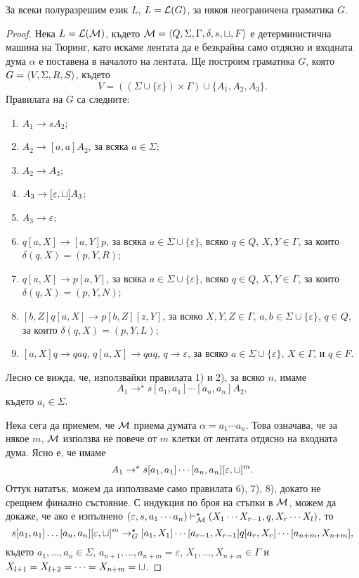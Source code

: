 \begin{lemma}
  За всеки полуразрешим език $L$, $L = \mathcal{L}(G)$, за някоя неограничена граматика $G$.  
\end{lemma}
\begin{proof}
  Нека $L = \mathcal{L}(\mathcal{M})$, където $\mathcal{M} = \langle{Q,\Sigma,\Gamma,\delta,s,\sqcup,F}\rangle$ е детерминистична машина на Тюринг,
  като искаме лентата да е безкрайна само отдясно и входната дума $\alpha$ е
  поставена в началото на лентата.
  Ще построим граматика $G$, която 
  $G = \langle{V,\Sigma,R,S}\rangle$, където 
  \[V = ((\Sigma\cup\{\varepsilon\})\times\Gamma) \cup \{A_1,A_2,A_3\}.\]
  Правилата на $G$ са следните:
  \begin{enumerate}[1)]
  \item 
    $A_1 \to sA_2$;
  \item
    $A_2 \to [a,a]A_2$, за всяка $a\in\Sigma$;
  \item
    $A_2 \to A_3$;
  \item
    $A_3 \to [\varepsilon,\sqcup]A_3$;
  \item
    $A_3 \to \varepsilon$;
  \item
    $q[a,X] \to [a,Y]p$, за всяка $a \in \Sigma\cup\{\varepsilon\}$, всяко $q\in Q$, $X,Y \in\Gamma$, 
    за които $\delta(q,X) = (p,Y,R)$;
  \item
    $q[a,X] \to p[a,Y]$, за всяка $a \in \Sigma\cup\{\varepsilon\}$, всяко $q\in Q$, $X,Y \in\Gamma$, 
    за които $\delta(q,X) = (p,Y,N)$;
  \item
    $[b,Z]q[a,X] \to p[b,Z][z,Y]$, за всяко $X,Y,Z \in \Gamma$, $a,b\in\Sigma\cup\{\varepsilon\}$, $q\in Q$,
    за които $\delta(q,X) = (p,Y,L)$;
  \item
    $[a,X]q \to qaq$, $q[a,X] \to qaq$, $q \to \varepsilon$, за всяко $a\in\Sigma\cup\{\varepsilon\}$, $X\in\Gamma$,
    и $q \in F$.
  \end{enumerate}
  
  Лесно се вижда, че, използвайки правилата 1) и 2), за всяко $n$, имаме
  \[A_1 \to^\star s[a_1,a_1]\cdots[a_n,a_n]A_2,\]
  където $a_i \in \Sigma$.

  Нека сега да приемем, че $\mathcal{M}$ приема думата $\alpha = a_1\cdots a_n$.
  Това означава, че за някое $m$, $\mathcal{M}$ използва не повече от $m$ клетки от лентата отдясно на входната дума.
  Ясно е, че имаме
  \[A_1 \to^\star s[a_1,a_1]\cdots[a_n,a_n][\varepsilon,\sqcup]^m.\]
  Оттук нататък, можем да използваме само правилата 6), 7), 8), докато не срещнем финално състояние.
  С индукция по броя на стъпки в $\mathcal{M}$, можем да докаже, че ако е изпълнено
  $(\varepsilon,s,a_1\cdots a_n) \vdash^\star_{\mathcal{M}} (X_1\cdots X_{r-1},q,X_r\cdots X_l)$, 
  то \[s[a_1,a_1]\dots[a_n,a_n][\varepsilon,\sqcup]^m \rightarrow^\star_G [a_1,X_1]\cdots[a_{r-1},X_{r-1}]q[a_r,X_r]\cdots[a_{n+m},X_{n+m}],\]
  където $a_1,\dots,a_n \in \Sigma$, $a_{n+1},\dots,a_{n+m} = \varepsilon$, $X_1,\dots,X_{n+m} \in \Gamma$ и
  $X_{l+1} = X_{l+2} = \dots = X_{n+m} = \sqcup$.
  

\end{proof}
